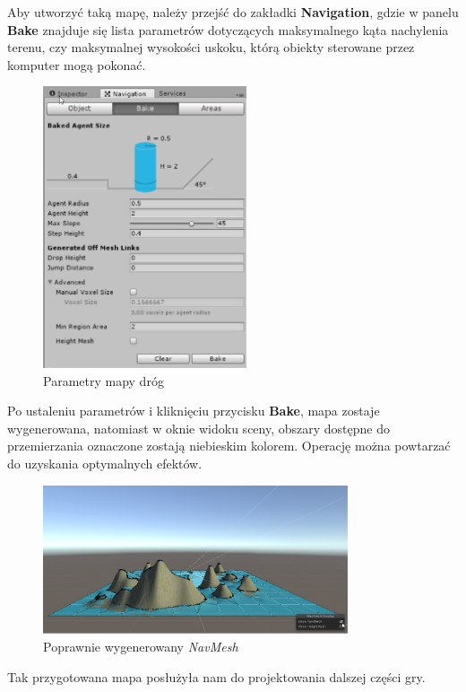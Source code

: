 \documentclass[openright]{xmgr}
\newcommand{\name}[1]{\textbf{\textcolor{NavyBlue}{#1}}}
\begin{document}
        Aby utworzyć taką mapę, należy przejść do zakładki \name{Navigation}, gdzie w panelu \name{Bake} znajduje się lista parametrów dotyczących maksymalnego kąta nachylenia terenu, czy maksymalnej wysokości uskoku, którą obiekty sterowane przez komputer mogą pokonać.

        \begin{figure}[H]
        \center
        \includegraphics[width=6cm]{teren_obiekty2.png}
        \caption{Parametry mapy dróg}
        \end{figure}

        Po ustaleniu parametrów i kliknięciu przycisku \name{Bake}, mapa zostaje wygenerowana, natomiast w oknie widoku sceny, obszary dostępne do przemierzania oznaczone zostają niebieskim kolorem. Operację można powtarzać do uzyskania optymalnych efektów.

        \begin{figure}[H]
        \center
        \includegraphics[width=9cm]{teren_obiekty3.png}
        \caption{Poprawnie wygenerowany \textit{NavMesh}}
        \end{figure}

        Tak przygotowana mapa posłużyła nam do projektowania dalszej części gry.

\end{document}
